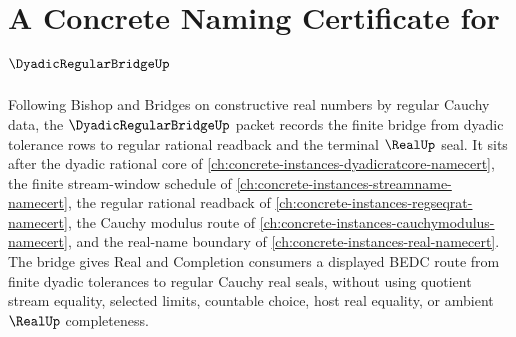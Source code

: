 \chapter{A Concrete Naming Certificate for $\DyadicRegularBridgeUp$}
\label{ch:concrete-instances-dyadic-regular-bridge-namecert}

Following Bishop and Bridges on constructive real numbers by regular Cauchy data, the $\DyadicRegularBridgeUp$ packet records the finite bridge from dyadic tolerance rows to regular rational readback and the terminal $\RealUp$ seal. It sits after the dyadic rational core of \autoref{ch:concrete-instances-dyadicratcore-namecert}, the finite stream-window schedule of \autoref{ch:concrete-instances-streamname-namecert}, the regular rational readback of \autoref{ch:concrete-instances-regseqrat-namecert}, the Cauchy modulus route of \autoref{ch:concrete-instances-cauchymodulus-namecert}, and the real-name boundary of \autoref{ch:concrete-instances-real-namecert}. The bridge gives Real and Completion consumers a displayed BEDC route from finite dyadic tolerances to regular Cauchy real seals, without using quotient stream equality, selected limits, countable choice, host real equality, or ambient $\RealUp$ completeness.

